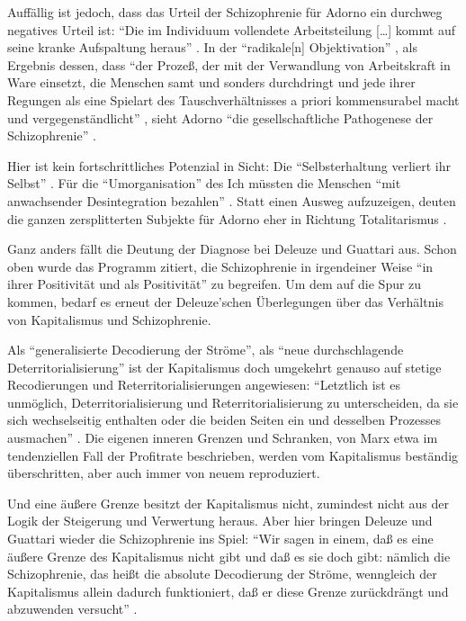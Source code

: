 \documentclass[12pt,
               DIV13,
               paper=a4,
               twoside=false,
               onehalfspacing,
               bibliography=totoc,
               toc=graduated,
               draft,
               ]{scrartcl}
\newcommand{\lips}{\dots\unkern}
\newcommand{\pc}[2]{\parencite[#1]{#2}}
\newcommand{\vgl}[2]{\parencite[vgl.][#1]{#2}}
\newcommand{\dg}{Deleuze und Guattari\xspace}
\begin{document}
Auffällig ist jedoch, dass das Urteil der Schizophrenie für Adorno ein
durchweg negatives Urteil ist: "`Die im Individuum vollendete
Arbeitsteilung [\lips] kommt auf seine kranke Aufspaltung heraus"'
\pc{263}{min}. In der "`radikale[n] Objektivation"' \pc{263}{min}, als
Ergebnis dessen, dass "`der Prozeß, der mit der Verwandlung von
Arbeitskraft in Ware einsetzt, die Menschen samt und sonders
durchdringt und jede ihrer Regungen als eine Spielart des
Tauschverhältnisses a priori kommensurabel macht und
vergegenständlicht"' \pc{262}{min}, sieht Adorno "`die
gesellschaftliche Pathogenese der Schizophrenie"' \pc{263}{min}.

Hier ist kein fortschrittliches Potenzial in Sicht: Die
"`Selbsterhaltung verliert ihr Selbst"' \pc{263}{min}. Für die
"`Umorganisation"' \pc{263}{min} des Ich müssten die Menschen "`mit
anwachsender Desintegration bezahlen"' \pc{263}{min}. Statt einen
Ausweg aufzuzeigen, deuten die ganzen zersplitterten Subjekte für
Adorno eher in Richtung Totalitarismus \vgl{263}{min}.

Ganz anders fällt die Deutung der Diagnose bei \dg aus.
Schon oben wurde das Programm zitiert, die Schizophrenie in
irgendeiner Weise "`in ihrer Positivität und als Positivität"'
\pc{24}{schizg} zu begreifen. Um dem auf die Spur zu kommen, bedarf es
erneut der Deleuze'schen Überlegungen über das Verhältnis von
Kapitalismus und Schizophrenie.

Als "`generalisierte Decodierung der Ströme"', als "`neue
durchschlagende Deterritorialisierung"' \pc{288}{ao} ist der
Kapitalismus doch umgekehrt genauso auf stetige Recodierungen und
Reterritorialisierungen angewiesen: "`Letztlich ist es unmöglich,
Deterritorialisierung und Reterritorialisierung zu unterscheiden, da
sie sich wechselseitig enthalten oder die beiden Seiten ein und
desselben Prozesses ausmachen"' \pc{333}{ao}. Die eigenen inneren
Grenzen und Schranken, von Marx etwa im tendenziellen Fall der
Profitrate beschrieben, werden vom Kapitalismus beständig
überschritten, aber auch immer von neuem reproduziert.

Und eine äußere Grenze besitzt der Kapitalismus nicht, zumindest nicht aus
der Logik der Steigerung und Verwertung heraus. Aber hier bringen
Deleuze und Guattari wieder die Schizophrenie ins Spiel: "`Wir sagen
in einem, daß es eine äußere Grenze des Kapitalismus nicht gibt und
daß es sie doch gibt: nämlich die Schizophrenie, das heißt die
absolute Decodierung der Ströme, wenngleich der Kapitalismus allein
dadurch funktioniert, daß er diese Grenze zurückdrängt und abzuwenden
versucht"' \pc{322}{ao}.
\end{document}
